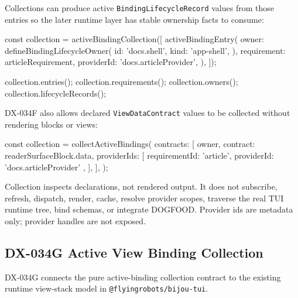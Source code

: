 Collections can produce active \texttt{B\allowbreak{}i\allowbreak{}n\allowbreak{}d\allowbreak{}i\allowbreak{}n\allowbreak{}g\allowbreak{}L\allowbreak{}i\allowbreak{}f\allowbreak{}e\allowbreak{}c\allowbreak{}y\allowbreak{}c\allowbreak{}l\allowbreak{}e\allowbreak{}R\allowbreak{}e\allowbreak{}c\allowbreak{}o\allowbreak{}r\allowbreak{}d} values from those entries so the later runtime layer has stable ownership facts to consume:

\begin{CodeBlock}
const collection = activeBindingCollection([
  activeBindingEntry({
    owner: defineBindingLifecycleOwner({
      id: 'docs.shell',
      kind: 'app-shell',
    }),
    requirement: articleRequirement,
    providerId: 'docs.articleProvider',
  }),
]);

collection.entries();
collection.requirements();
collection.owners();
collection.lifecycleRecords();
\end{CodeBlock}

DX-034F also allows declared \texttt{V\allowbreak{}i\allowbreak{}e\allowbreak{}w\allowbreak{}D\allowbreak{}a\allowbreak{}t\allowbreak{}a\allowbreak{}C\allowbreak{}o\allowbreak{}n\allowbreak{}t\allowbreak{}r\allowbreak{}a\allowbreak{}c\allowbreak{}t} values to be collected without rendering blocks or views:

\begin{CodeBlock}
const collection = collectActiveBindings({
  contracts: [{
    owner,
    contract: readerSurfaceBlock.data,
    providerIds: [
      { requirementId: 'article', providerId: 'docs.articleProvider' },
    ],
  }],
});
\end{CodeBlock}

Collection inspects declarations, not rendered output. It does not subscribe, refresh, dispatch, render, cache, resolve provider scopes, traverse the real TUI runtime tree, bind schemas, or integrate DOGFOOD. Provider ids are metadata only; provider handles are not exposed.

\subsection{DX-034G Active View Binding Collection}\label{record-132-dx-034g-active-view-binding-collection}

DX-034G connects the pure active-binding collection contract to the existing runtime view-stack model in \texttt{@\allowbreak{}f\allowbreak{}l\allowbreak{}y\allowbreak{}i\allowbreak{}n\allowbreak{}g\allowbreak{}r\allowbreak{}o\allowbreak{}b\allowbreak{}o\allowbreak{}t\allowbreak{}s\allowbreak{}/\allowbreak{}b\allowbreak{}i\allowbreak{}j\allowbreak{}o\allowbreak{}u\allowbreak{}-\allowbreak{}t\allowbreak{}u\allowbreak{}i}.

